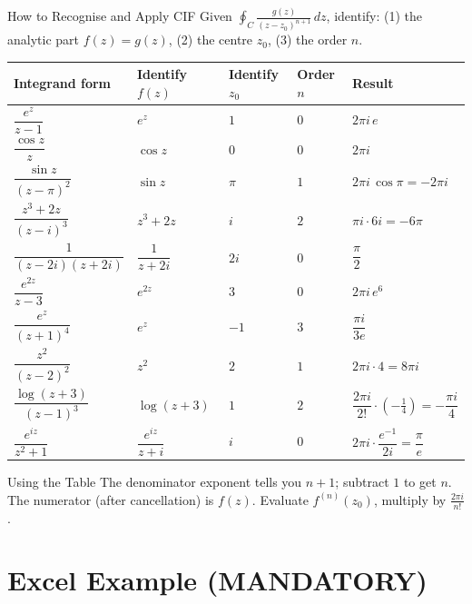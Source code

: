 \documentclass[12pt,a4paper]{article}
\begin{document}
\begin{infobox}{How to Recognise and Apply CIF}
Given $\displaystyle\oint_C \frac{g(z)}{(z - z_0)^{n+1}}\,dz$, identify:
(1) the analytic part $f(z) = g(z)$, (2) the centre $z_0$, (3) the order $n$.
\end{infobox}

\medskip

\begin{center}
\begin{tabular}{p{5.5cm} p{3.5cm} p{2.5cm} p{2cm} p{3cm}}
\toprule
Integrand form & Identify $f(z)$ & Identify $z_0$ & Order $n$ & Result \\
\midrule
$\dfrac{e^z}{z - 1}$ & $e^z$ & $1$ & $0$ & $2\pi i\,e$ \\[6pt]
$\dfrac{\cos z}{z}$ & $\cos z$ & $0$ & $0$ & $2\pi i$ \\[6pt]
$\dfrac{\sin z}{(z-\pi)^2}$ & $\sin z$ & $\pi$ & $1$ & $2\pi i\,\cos\pi = -2\pi i$ \\[6pt]
$\dfrac{z^3+2z}{(z-i)^3}$ & $z^3+2z$ & $i$ & $2$ & $\pi i \cdot 6i = -6\pi$ \\[6pt]
$\dfrac{1}{(z-2i)(z+2i)}$ & $\dfrac{1}{z+2i}$ & $2i$ & $0$ & $\dfrac{\pi}{2}$ \\[6pt]
$\dfrac{e^{2z}}{z-3}$ & $e^{2z}$ & $3$ & $0$ & $2\pi i\,e^6$ \\[6pt]
$\dfrac{e^z}{(z+1)^4}$ & $e^z$ & $-1$ & $3$ & $\dfrac{\pi i}{3e}$ \\[6pt]
$\dfrac{z^2}{(z-2)^2}$ & $z^2$ & $2$ & $1$ & $2\pi i \cdot 4 = 8\pi i$ \\[6pt]
$\dfrac{\log(z+3)}{(z-1)^3}$ & $\log(z+3)$ & $1$ & $2$ & $\dfrac{2\pi i}{2!}\cdot\left(-\frac{1}{4}\right) = -\dfrac{\pi i}{4}$ \\[6pt]
$\dfrac{e^{iz}}{z^2+1}$ & $\dfrac{e^{iz}}{z+i}$ & $i$ & $0$ & $2\pi i\cdot\dfrac{e^{-1}}{2i} = \dfrac{\pi}{e}$ \\[6pt]
\bottomrule
\end{tabular}
\end{center}

\begin{learnbox}{Using the Table}
The denominator exponent tells you $n+1$; subtract $1$ to get $n$.
The numerator (after cancellation) is $f(z)$.  Evaluate $f^{(n)}(z_0)$,
multiply by $\frac{2\pi i}{n!}$.
\end{learnbox}

\section{Excel Example (MANDATORY)}
\end{document}
